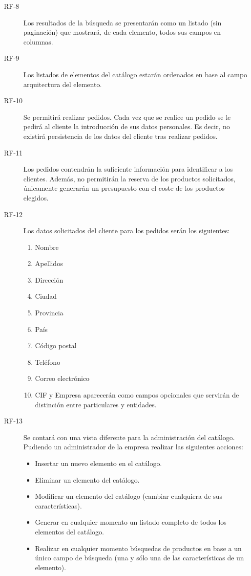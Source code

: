 \begin{description}
\item[RF-8] Los resultados de la búsqueda se presentarán como un listado (sin paginación) que mostrará, de cada elemento, todos sus campos en columnas.

\item[RF-9] Los listados de elementos del catálogo estarán ordenados en base al campo arquitectura del elemento.

\item[RF-10] Se permitirá realizar pedidos. Cada vez que se realice un pedido se le pedirá al cliente la introducción de sus datos personales. Es decir, no existirá persistencia de los datos del cliente tras realizar pedidos.

\item[RF-11] Los pedidos contendrán la suficiente información para identificar a los clientes. Además, no permitirán la reserva de los productos solicitados, únicamente generarán un presupuesto con el coste de los productos elegidos.

\item[RF-12] Los datos solicitados del cliente para los pedidos serán los siguientes:
	\begin{enumerate}
		\item Nombre 
		\item Apellidos
	    \item Dirección
	    \item Ciudad
	    \item Provincia
	    \item País
	    \item Código postal
	    \item Teléfono
	    \item Correo electrónico
	    \item CIF y Empresa aparecerán como campos opcionales que servirán de distinción entre particulares y entidades.
	\end{enumerate}

\item[RF-13] Se contará con una vista diferente para la administración del catálogo. Pudiendo un administrador de la empresa realizar las siguientes acciones:
	\begin{itemize}
    	\item Insertar un nuevo elemento en el catálogo.
		\item Eliminar un elemento del catálogo.
        \item Modificar un elemento del catálogo (cambiar cualquiera de sus características).
        \item Generar en cualquier momento un listado completo de todos los elementos del catálogo.
        \item Realizar en cualquier momento búsquedas de productos en base a un único campo de búsqueda (una y sólo una de las características de un elemento).
    \end{itemize}   
\end{description}
